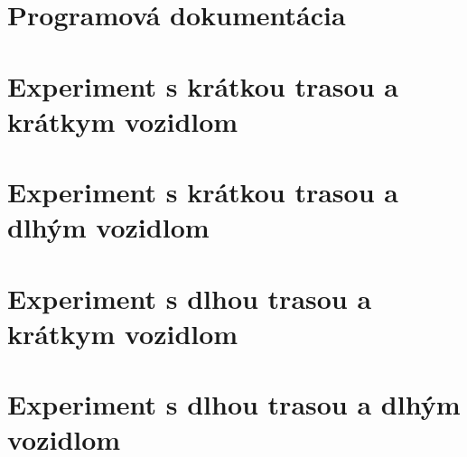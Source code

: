 \chapter{Programová dokumentácia}
\label{prilohy_programova_dokumentacia}

\chapter{Experiment s krátkou trasou a krátkym vozidlom}
\label{shortDshortV}


\chapter{Experiment s krátkou trasou a dlhým vozidlom}
\label{shortDlongV}


\chapter{Experiment s dlhou trasou a krátkym vozidlom}
\label{longDshortV}


\chapter{Experiment s dlhou trasou a dlhým vozidlom}
\label{longDlongV}










